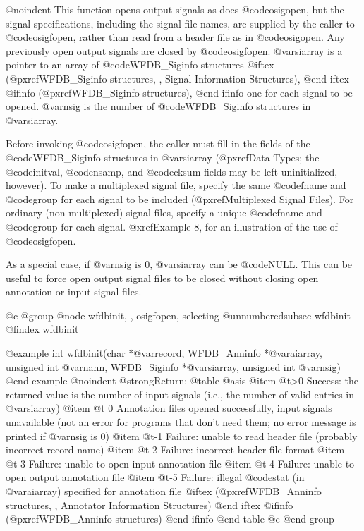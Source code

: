 {{{{{{{{{@noindent
This function opens output signals as does @code{osigopen}, but the
signal specifications, including the signal file names, are supplied by
the caller to @code{osigfopen}, rather than read from a header
file as in @code{osigopen}.  Any previously open output signals are
closed by @code{osigfopen}.  @var{siarray} is a pointer to an array of
@code{WFDB_Siginfo} structures
@iftex
(@pxref{WFDB_Siginfo structures, , Signal Information Structures}),
@end iftex
@ifinfo
(@pxref{WFDB_Siginfo structures}),
@end ifinfo
one for each signal to be opened.  @var{nsig} is the number of
@code{WFDB_Siginfo} structures in @var{siarray}.

Before invoking @code{osigfopen}, the caller must fill in the fields of
the @code{WFDB_Siginfo} structures in @var{siarray} (@pxref{Data Types};
the @code{initval}, @code{nsamp}, and @code{cksum} fields may be left
uninitialized, however).  To make a multiplexed signal file, specify the
same @code{fname} and @code{group} for each signal to be included
(@pxref{Multiplexed Signal Files}).  For ordinary (non-multiplexed)
signal files, specify a unique @code{fname} and @code{group} for each
signal.  @xref{Example 8}, for an illustration of the use of
@code{osigfopen}.

As a special case, if @var{nsig} is 0, @var{siarray} can be @code{NULL}.
This can be useful to force open output signal files to be closed
without closing open annotation or input signal files.

@c @group
@node     wfdbinit, , osigfopen, selecting    
@unnumberedsubsec wfdbinit
@findex wfdbinit

@example
int wfdbinit(char *@var{record}, WFDB_Anninfo *@var{aiarray}, unsigned int @var{nann},
           WFDB_Siginfo *@var{siarray}, unsigned int @var{nsig})
@end example
@noindent
@strong{Return:}
@table @asis
@item @t{>0}
Success: the returned value is the number of input signals (i.e., the
number of valid entries in @var{siarray})
@item @t{ 0}
Annotation files opened successfully, input signals unavailable
(not an error for programs that don't need them; no error
message is printed if @var{nsig} is 0)
@item @t{-1}
Failure: unable to read header file (probably incorrect record
name)
@item @t{-2}
Failure: incorrect header file format
@item @t{-3}
Failure: unable to open input annotation file
@item @t{-4}
Failure: unable to open output annotation file
@item @t{-5}
Failure: illegal @code{stat} (in @var{aiarray}) specified for annotation file
@iftex
(@pxref{WFDB_Anninfo structures, , Annotator Information Structures})
@end iftex
@ifinfo
(@pxref{WFDB_Anninfo structures})
@end ifinfo
@end table
@c @end group

}}}}}}}}}
